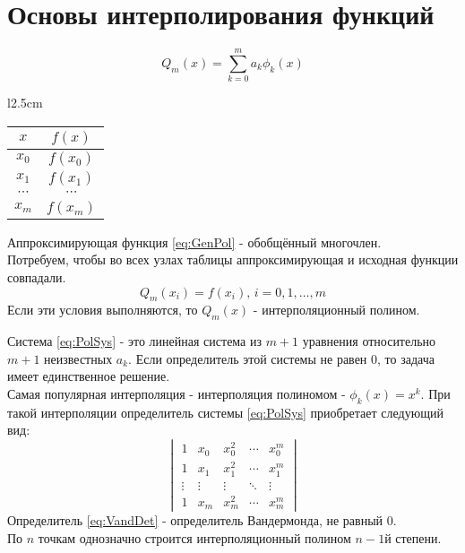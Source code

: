 \documentclass[a4paper,11pt]{article}
\begin{document}
\section{Основы интерполирования функций}
\begin{minipage}{1\linewidth}
  \begin{equation}
    Q_m(x) = \sum_{k=0}^{m} a_k \phi_k(x)
    \label{eq:GenPol}
  \end{equation}
  \begin{wraptable}{l}{2.5cm}
    \begin{tabular}{ c|c }
      $x$ & $f(x)$ \\
      \hline
      $x_0$ & $f(x_0)$ \\
      $x_1$ & $f(x_1)$ \\
      $\cdots$ & $\cdots$ \\
      $x_m$ & $f(x_m)$
    \end{tabular}
  \end{wraptable}

  Аппроксимирующая функция \ref{eq:GenPol} - обобщённый многочлен. \\
  Потребуем, чтобы во всех узлах таблицы аппроксимирующая и исходная функции совпадали.
  \begin{equation}
    Q_m(x_i) = f(x_i), \, i = 0, 1, \dots, m
    \label{eq:PolSys}
  \end{equation}
  Если эти условия выполняются, то $Q_m(x)$ - интерполяционный полином.  
\vspace{2mm}
\end{minipage}
\newline
Система \ref{eq:PolSys} - это линейная система из $m+1$ уравнения относительно $m+1$ неизвестных $a_k$. Если определитель этой системы не равен $0$, то задача имеет единственное решение. \\
\newline
Самая популярная интерполяция - интерполяция полиномом - \(\phi_k(x) = x^k\).
При такой интерполяции определитель системы \ref{eq:PolSys} приобретает следующий вид:
\begin{equation}
  \begin{vmatrix}
    1 & x_0 & x_0^2 & \cdots & x_0^m \\
    1 & x_1 & x_1^2 & \cdots & x_1^m \\
    \vdots & \vdots & \vdots & \ddots & \vdots \\
    1 & x_m & x_m^2 & \cdots & x_m^m
  \end{vmatrix}
  \label{eq:VandDet}
\end{equation}
Определитель \ref{eq:VandDet} - определитель Вандермонда, не равный $0$. \\
По $n$ точкам однозначно строится интерполяционный полином $n-1$й степени. \\
\end{document}
